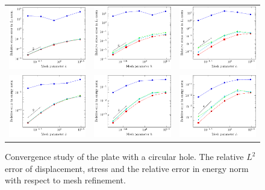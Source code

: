 \begin{figure}[h]
\begin{tabular}{ccc}
        \includegraphics[width=.31\linewidth]{stress_p_2}      & \includegraphics[width=.31\linewidth]{stress_p_3}      & \includegraphics[width=.31\linewidth]{stress_p_4}      \\
        \includegraphics[width=.31\linewidth]{energy_p_2}      & \includegraphics[width=.31\linewidth]{energy_p_3}      & \includegraphics[width=.31\linewidth]{energy_p_4}
    \end{tabular}
    \caption{Convergence study of the plate with a circular hole. The relative $L^2$ error of displacement, stress and the relative error in energy norm with respect to mesh refinement.}
    \label{fig:platewithhole_convergence}
\end{figure}


